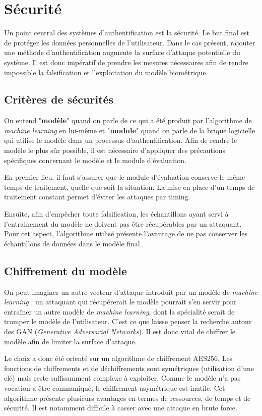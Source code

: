 \section{Sécurité}
Un point central des systèmes d'authentification est la sécurité.
Le but final est de protéger les données personnelles de l'utilisateur. Dans le cas présent, rajouter une méthode d'authentification augmente la surface d'attaque potentielle du système. Il est donc impératif de prendre les mesures nécessaires afin de rendre impossible la falsification et l'exploitation du modèle biométrique.

\subsection{Critères de sécurités}
On entend "\textbf{modèle}" quand on parle de ce qui a été produit par l'algorithme de \textit{machine learning} en lui-même et "\textbf{module}" quand on parle de la brique logicielle qui utilise le modèle dans un processus d'authentification.
Afin de rendre le modèle le plus sûr possible, il est nécessaire d'appliquer des précautions spécifiques concernant le modèle et le module d'évaluation.

En premier lieu, il faut s'assurer que le module d'évaluation conserve le même temps de traitement, quelle que soit la situation. La mise en place d'un temps de traitement constant permet d'éviter les attaques par timing.

Ensuite, afin d'empêcher toute falsification, les échantillons ayant servi à l'entrainement du modèle ne doivent pas être récupérables par un attaquant. Pour cet aspect, l'algorithme utilisé présente l'avantage de ne pas conserver les échantillons de données dans le modèle final.

\subsection{Chiffrement du modèle}

On peut imaginer un autre vecteur d'attaque introduit par un modèle de \textit{machine learning} : un attaquant qui récupérerait le modèle pourrait s'en servir pour entraîner un autre modèle de \textit{machine learning}, dont la spécialité serait de tromper le modèle de l'utilisateur. C'est ce que laisse penser la recherche autour des GAN (\textit{Generative Adversarial Networks}). 
Il est donc vital de chiffrer le modèle afin de limiter la surface d'attaque.

Le choix a donc été orienté sur un algorithme de chiffrement AES256. Les fonctions de chiffrements et de déchiffrements sont symétriques (utilisation d'une clé) mais reste suffisamment complexe à exploiter. Comme le modèle n'a pas vocation à être communiqué, le chiffrement asymétrique est inutile.
Cet algorithme présente plusieurs avantages en termes de ressources, de temps et de sécurité. Il est notamment difficile à casser avec une attaque en brute force.


